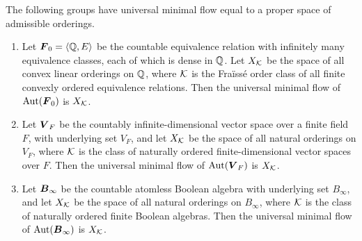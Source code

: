 \begin{theorem}
\label{thm:umf-structured-ordering-spaces}
The following groups have universal minimal flow equal to a proper space of admissible orderings.
\begin{enumerate}
    \item[(i)] Let \(\boldsymbol{F}_0=\langle \mathbb{Q},E\rangle\) be the countable equivalence relation with infinitely many equivalence classes, each of which is dense in \(\mathbb{Q}\). Let \(X_{\mathcal{K}}\) be the space of all convex linear orderings on \(\mathbb{Q}\), where \(\mathcal{K}\) is the Fraïssé order class of all finite convexly ordered equivalence relations. Then the universal minimal flow of \(\operatorname{Aut}(\boldsymbol{F}_0)\) is \(X_{\mathcal{K}}\).

    \item[(ii)] Let \(\boldsymbol{V}_F\) be the countably infinite-dimensional vector space over a finite field \(F\), with underlying set \(V_F\), and let \(X_{\mathcal{K}}\) be the space of all natural orderings on \(V_F\), where \(\mathcal{K}\) is the class of naturally ordered finite-dimensional vector spaces over \(F\). Then the universal minimal flow of \(\operatorname{Aut}(\boldsymbol{V}_F)\) is \(X_{\mathcal{K}}\).

    \item[(iii)] Let \(\boldsymbol{B}_\infty\) be the countable atomless Boolean algebra with underlying set \(B_\infty\), and let \(X_{\mathcal{K}}\) be the space of all natural orderings on \(B_\infty\), where \(\mathcal{K}\) is the class of naturally ordered finite Boolean algebras. Then the universal minimal flow of \(\operatorname{Aut}(\boldsymbol{B}_\infty)\) is \(X_{\mathcal{K}}\).
\end{enumerate}
\end{theorem}

